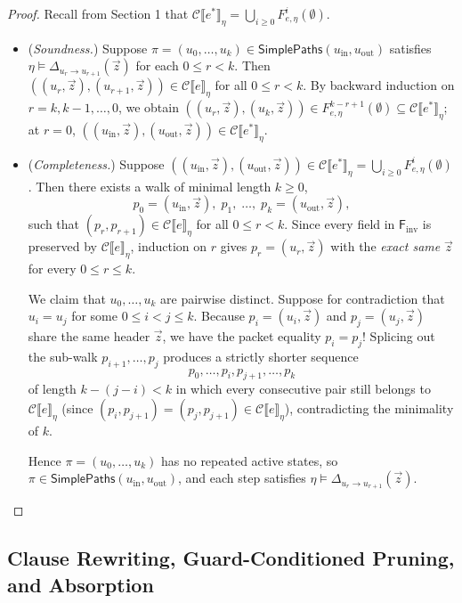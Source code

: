 \documentclass[11pt,a4paper]{article}
\theoremstyle{definition}
\theoremstyle{remark}
\newcommand{\Csem}[1]{\mathcal{C}\llbracket #1 \rrbracket}
\begin{document}
\begin{proof}
Recall from Section 1 that $\Csem{e^*}_\eta = \bigcup_{i \ge 0} F_{e,\eta}^i(\emptyset)$.
\begin{itemize}
  \item[$(\Leftarrow)$] (\emph{Soundness.}) Suppose $\pi = (u_0, \dots, u_k) \in \mathsf{SimplePaths}(u_{\mathrm{in}}, u_{\mathrm{out}})$
    satisfies $\eta \models \Delta_{u_r \to u_{r+1}}(\vec{z})$ for each $0 \le r < k$. Then
    $((u_r, \vec{z}), (u_{r+1}, \vec{z})) \in \Csem{e}_\eta$ for all $0 \le r < k$. By backward
    induction on $r = k, k-1, \dots, 0$, we obtain
    $((u_r, \vec{z}), (u_k, \vec{z})) \in F_{e,\eta}^{k-r + 1}(\emptyset) \subseteq \Csem{e^*}_\eta$;
    at $r = 0$, $((u_{\mathrm{in}}, \vec{z}), (u_{\mathrm{out}}, \vec{z})) \in \Csem{e^*}_\eta$.

  \item[$(\Rightarrow)$] (\emph{Completeness.}) Suppose
    $((u_{\mathrm{in}}, \vec{z}), (u_{\mathrm{out}}, \vec{z})) \in \Csem{e^*}_\eta = \bigcup_{i \ge 0} F_{e,\eta}^i(\emptyset)$.
    Then there exists a walk of minimal length $k \ge 0$,
    \[
      p_0 = (u_{\mathrm{in}}, \vec{z}),\; p_1,\; \dots,\; p_k = (u_{\mathrm{out}}, \vec{z}),
    \]
    such that $(p_r, p_{r+1}) \in \Csem{e}_\eta$ for all $0 \le r < k$. Since every field in
    $\mathsf{F}_{\mathrm{inv}}$ is preserved by $\Csem{e}_\eta$, induction on $r$ gives
    $p_r = (u_r, \vec{z})$ with the \emph{exact same} $\vec{z}$ for every $0 \le r \le k$.

    We claim that $u_0, \dots, u_k$ are pairwise distinct. Suppose for contradiction that
    $u_i = u_j$ for some $0 \le i < j \le k$. Because $p_i = (u_i, \vec{z})$ and
    $p_j = (u_j, \vec{z})$ share the same header $\vec{z}$, we have the packet equality $p_i = p_j$!
    Splicing out the sub-walk $p_{i+1}, \dots, p_j$ produces a strictly shorter sequence
    \[
      p_0, \dots, p_i, p_{j+1}, \dots, p_k
    \]
    of length $k - (j - i) < k$ in which every consecutive pair still belongs to $\Csem{e}_\eta$
    (since $(p_i, p_{j+1}) = (p_j, p_{j+1}) \in \Csem{e}_\eta$), contradicting the minimality of $k$.

    Hence $\pi = (u_0, \dots, u_k)$ has no repeated active states, so
    $\pi \in \mathsf{SimplePaths}(u_{\mathrm{in}}, u_{\mathrm{out}})$, and each step satisfies
    $\eta \models \Delta_{u_r \to u_{r+1}}(\vec{z})$. \qedhere
\end{itemize}
\end{proof}

\subsection{Clause Rewriting, Guard-Conditioned Pruning, and Absorption}
\end{document}
